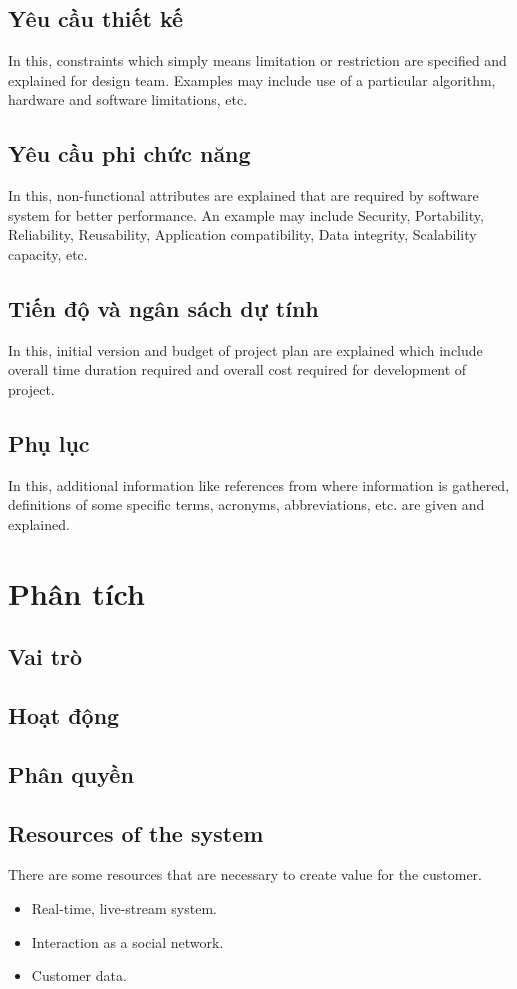 \documentclass{report}
\begin{document}
\section{Yêu cầu thiết kế}
In this, constraints which simply means limitation or restriction are specified and explained for design team. Examples may include use of a particular algorithm, hardware and software limitations, etc.


\section{Yêu cầu phi chức năng}
In this, non-functional attributes are explained that are required by software system for better performance. An example may include Security, Portability, Reliability, Reusability, Application compatibility, Data integrity, Scalability capacity, etc.


\section{Tiến độ và ngân sách dự tính}
In this, initial version and budget of project plan are explained which include overall time duration required and overall cost required for development of project.


\section{Phụ lục}
In this, additional information like references from where information is gathered, definitions of some specific terms, acronyms, abbreviations, etc. are given and explained.

\chapter{Phân tích}
\section{Vai trò}
\section{Hoạt động}
\section{Phân quyền}
\section{Resources of the system}
There are some resources that are necessary to create value for the customer.
\begin{itemize}
	\item Real-time, live-stream system.
	\item Interaction as a social network.
	\item Customer data.
\end{itemize}
\end{document}

